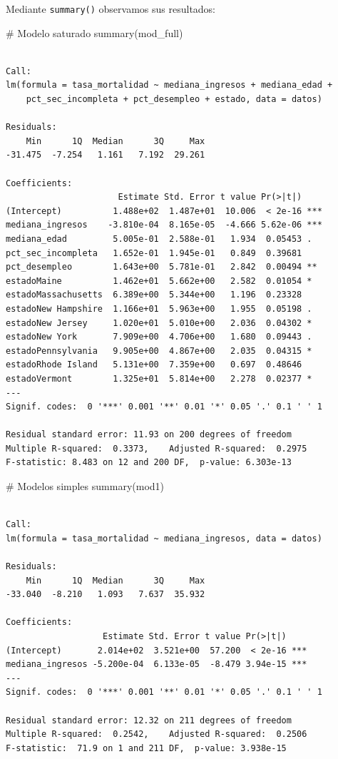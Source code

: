 \documentclass[
  spanish,
  a4paper,
]{scrbook}
\newenvironment{Shaded}{\begin{snugshade}}{\end{snugshade}}
\newcommand{\CommentTok}[1]{\textcolor[rgb]{0.37,0.37,0.37}{#1}}
\newcommand{\FunctionTok}[1]{\textcolor[rgb]{0.28,0.35,0.67}{#1}}
\newcommand{\NormalTok}[1]{\textcolor[rgb]{0.00,0.23,0.31}{#1}}
\begin{document}
Mediante \texttt{summary()} observamos sus resultados:

\begin{Shaded}
\begin{Highlighting}[]
\CommentTok{\# Modelo saturado}
\FunctionTok{summary}\NormalTok{(mod\_full)}
\end{Highlighting}
\end{Shaded}

\begin{verbatim}

Call:
lm(formula = tasa_mortalidad ~ mediana_ingresos + mediana_edad + 
    pct_sec_incompleta + pct_desempleo + estado, data = datos)

Residuals:
    Min      1Q  Median      3Q     Max 
-31.475  -7.254   1.161   7.192  29.261 

Coefficients:
                      Estimate Std. Error t value Pr(>|t|)    
(Intercept)          1.488e+02  1.487e+01  10.006  < 2e-16 ***
mediana_ingresos    -3.810e-04  8.165e-05  -4.666 5.62e-06 ***
mediana_edad         5.005e-01  2.588e-01   1.934  0.05453 .  
pct_sec_incompleta   1.652e-01  1.945e-01   0.849  0.39681    
pct_desempleo        1.643e+00  5.781e-01   2.842  0.00494 ** 
estadoMaine          1.462e+01  5.662e+00   2.582  0.01054 *  
estadoMassachusetts  6.389e+00  5.344e+00   1.196  0.23328    
estadoNew Hampshire  1.166e+01  5.963e+00   1.955  0.05198 .  
estadoNew Jersey     1.020e+01  5.010e+00   2.036  0.04302 *  
estadoNew York       7.909e+00  4.706e+00   1.680  0.09443 .  
estadoPennsylvania   9.905e+00  4.867e+00   2.035  0.04315 *  
estadoRhode Island   5.131e+00  7.359e+00   0.697  0.48646    
estadoVermont        1.325e+01  5.814e+00   2.278  0.02377 *  
---
Signif. codes:  0 '***' 0.001 '**' 0.01 '*' 0.05 '.' 0.1 ' ' 1

Residual standard error: 11.93 on 200 degrees of freedom
Multiple R-squared:  0.3373,    Adjusted R-squared:  0.2975 
F-statistic: 8.483 on 12 and 200 DF,  p-value: 6.303e-13
\end{verbatim}

\begin{Shaded}
\begin{Highlighting}[]
\CommentTok{\# Modelos simples}
\FunctionTok{summary}\NormalTok{(mod1)}
\end{Highlighting}
\end{Shaded}

\begin{verbatim}

Call:
lm(formula = tasa_mortalidad ~ mediana_ingresos, data = datos)

Residuals:
    Min      1Q  Median      3Q     Max 
-33.040  -8.210   1.093   7.637  35.932 

Coefficients:
                   Estimate Std. Error t value Pr(>|t|)    
(Intercept)       2.014e+02  3.521e+00  57.200  < 2e-16 ***
mediana_ingresos -5.200e-04  6.133e-05  -8.479 3.94e-15 ***
---
Signif. codes:  0 '***' 0.001 '**' 0.01 '*' 0.05 '.' 0.1 ' ' 1

Residual standard error: 12.32 on 211 degrees of freedom
Multiple R-squared:  0.2542,    Adjusted R-squared:  0.2506 
F-statistic:  71.9 on 1 and 211 DF,  p-value: 3.938e-15
\end{verbatim}
\end{document}
